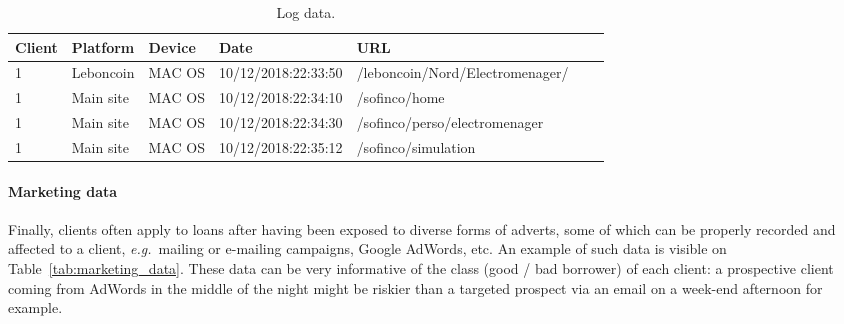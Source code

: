 \begin{table}[ht]
    \centering
    \caption{Log data.}
    \label{tab:log_data}
    \begin{small}
\begin{tabular}{lllllll}
Client & Platform & Device & Date & URL \\
 \hline
1 & Leboncoin & MAC OS & 10/12/2018:22:33:50 & /leboncoin/Nord/Electromenager/ \\
1 & Main site & MAC OS & 10/12/2018:22:34:10 & /sofinco/home \\
1 & Main site & MAC OS & 10/12/2018:22:34:30 & /sofinco/perso/electromenager \\
1 & Main site & MAC OS & 10/12/2018:22:35:12 & /sofinco/simulation \\
\end{tabular}
    \end{small}
\end{table}





\paragraph{Marketing data}

Finally, clients often apply to loans after having been exposed to diverse forms of adverts, some of which can be properly recorded and affected to a client, \textit{e.g.}\ mailing or e-mailing campaigns, Google AdWords, etc. An example of such data is visible on Table~\ref{tab:marketing_data}. These data can be very informative of the class (good / bad borrower) of each client: a prospective client coming from AdWords in the middle of the night might be riskier than a targeted prospect via an email on a week-end afternoon for example.

\begin{table}[ht]
    \centering
    \caption{Marketing data.}
    \label{tab:marketing_data}
\begin{tiny}
\end{tiny}
\end{table}

